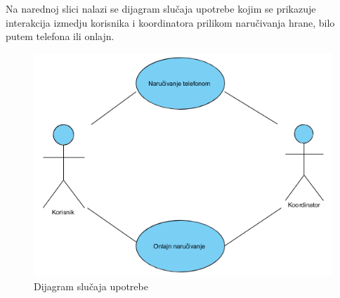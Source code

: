 Na narednoj slici nalazi se dijagram slučaja upotrebe kojim se prikazuje interakcija izmedju korisnika i koordinatora prilikom naručivanja hrane, bilo putem telefona ili onlajn.

\begin{figure}[!h]
    \includegraphics[width=1\textwidth]{slike/Upravljanje_porudzbinomUC.png}
    \caption{Dijagram slučaja upotrebe}
\end{figure}

